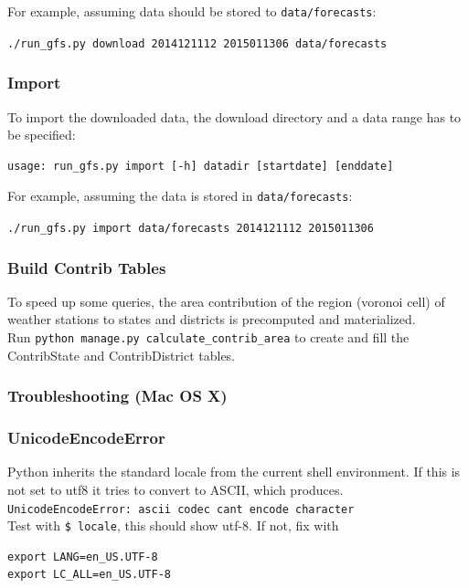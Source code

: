 \documentclass[paper=a4, fontsize=11pt]{scrartcl} %
\numberwithin{equation}{section} %
\numberwithin{figure}{section} %
\numberwithin{table}{section} %
\begin{document}
For example, assuming data should be stored to \texttt{data/forecasts}:

\texttt{./run\_gfs.py\ download\ 2014121112\ 2015011306\ data/forecasts}

\subsubsection*{Import}\label{import}

To import the downloaded data, the download directory and a data range
has to be specified:

\begin{verbatim}
usage: run_gfs.py import [-h] datadir [startdate] [enddate]
\end{verbatim}

For example, assuming the data is stored in \texttt{data/forecasts}:

\texttt{./run\_gfs.py\ import\ data/forecasts\ 2014121112\ 2015011306}

\subsubsection*{Build Contrib Tables}\label{build-contrib-tables}

To speed up some queries, the area contribution of the region (voronoi
cell) of weather stations to states and districts is precomputed and
materialized. \\
Run \texttt{python\ manage.py\ calculate\_contrib\_area}
to create and fill the ContribState and ContribDistrict tables.

\subsubsection*{Troubleshooting (Mac OS X)}\label{troubleshooting}

\subsubsection*{UnicodeEncodeError}\label{unicodeencodeerror}

Python inherits the standard locale from the current shell environment.
If this is not set to utf8 it tries to convert to ASCII, which
produces.\\
\texttt{UnicodeEncodeError:\ \textquotesingle{}ascii\textquotesingle{}\ codec\ can\textquotesingle{}t\ encode\ character}\\Test
with \texttt{\$\ locale}, this should show utf-8. If not, fix with
\begin{verbatim}
export LANG=en_US.UTF-8
export LC_ALL=en_US.UTF-8
\end{verbatim}
\end{document}
